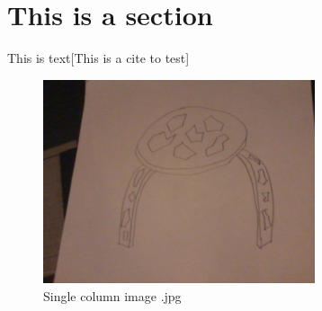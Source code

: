 \section{This is a section}
This is text\cite{test}[This is a cite to test]






\begin{figure}
\centering
\includegraphics[width=80mm]{img/img}
\caption{Single column image .jpg}
\end{figure}


